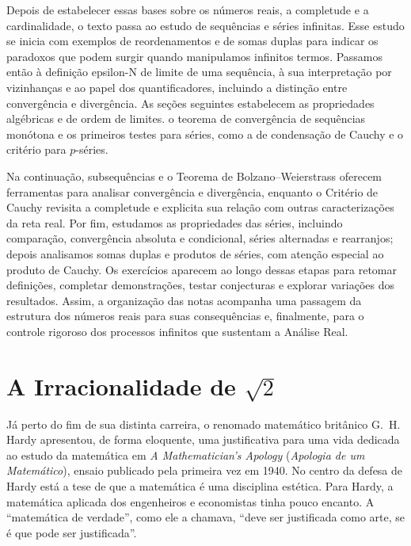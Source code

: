 Depois de estabelecer essas bases sobre os números reais, a completude e a
cardinalidade, o texto passa ao estudo de sequências e séries infinitas. Esse
estudo se inicia com exemplos de reordenamentos e de somas duplas para indicar os paradoxos que
podem surgir quando manipulamos infinitos termos. Passamos então à definição
epsilon-N de limite de uma sequência, à sua interpretação por vizinhanças e
ao papel dos quantificadores, incluindo a distinção entre convergência e
divergência. As seções seguintes estabelecem as propriedades algébricas e de
ordem de limites. o teorema de convergência de sequências monótona e os primeiros testes
para séries, como a de condensação de Cauchy e o critério para $p$-séries.

Na continuação, subsequências e o Teorema de Bolzano--Weierstrass oferecem
ferramentas para analisar convergência e divergência, enquanto o Critério de
Cauchy revisita a completude e explicita sua relação com outras
caracterizações da reta real. Por fim, estudamos as propriedades das séries,
incluindo comparação, convergência absoluta e condicional, séries alternadas
e rearranjos; depois analisamos somas duplas e produtos de séries, com
atenção especial ao produto de Cauchy. Os exercícios aparecem ao longo
dessas etapas para retomar definições, completar demonstrações, testar
conjecturas e explorar variações dos resultados. Assim, a organização das
notas acompanha uma passagem da estrutura dos números reais para suas
consequências e, finalmente, para o controle rigoroso dos processos
infinitos que sustentam a Análise Real.


\section{A Irracionalidade de $\sqrt{2}$}\label{sec:irracionalidade-sqrt2}

Já perto do fim de sua distinta carreira, o renomado matemático britânico G.~H. Hardy apresentou, de forma eloquente, uma justificativa para uma vida dedicada ao estudo da matemática em \textit{A Mathematician's Apology} (\textit{Apologia de um Matemático}), ensaio publicado pela primeira vez em 1940. No centro da defesa de Hardy está a tese de que a matemática é uma disciplina estética. Para Hardy, a matemática aplicada dos engenheiros e economistas tinha pouco encanto. A ``matemática de verdade'', como ele a chamava, ``deve ser justificada como arte, se é que pode ser justificada''.

